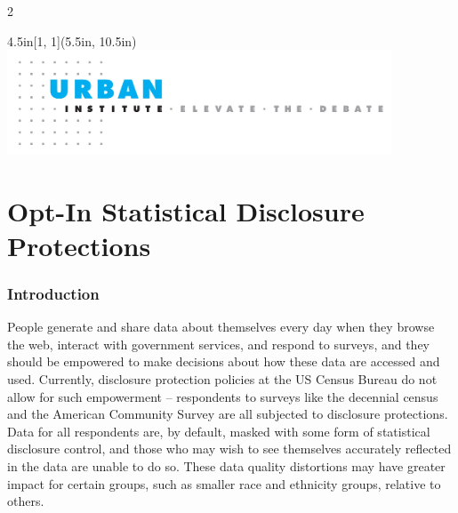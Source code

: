 \documentclass[
]{urban-formatting}
\begin{document}
\begin{titlepage}
\begin{multicols}{2}
      
    \end{multicols}
    

    \begin{textblock*}{4.5in}[1, 1](5.5in, 10.5in)
        \noindent\includegraphics[width=4.5in]{images/cover-footer.jpg}
    \end{textblock*}
\end{titlepage}



\cleardoublepage

\setcounter{page}{3}
\begin{singlespace}
    \tableofcontents
\end{singlespace}

\thispagestyle{empty}





\part{Opt-In Statistical Disclosure Protections}

\section{Introduction}

People generate and share data about themselves every day when they
browse the web, interact with government services, and respond to
surveys, and they should be empowered to make decisions about how these
data are accessed and used. Currently, disclosure protection policies at
the US Census Bureau do not allow for such empowerment -- respondents to
surveys like the decennial census and the American Community Survey are
all subjected to disclosure protections. Data for all respondents are,
by default, masked with some form of statistical disclosure control, and
those who may wish to see themselves accurately reflected in the data
are unable to do so. These data quality distortions may have greater
impact for certain groups, such as smaller race and ethnicity groups,
relative to others.
\end{document}
